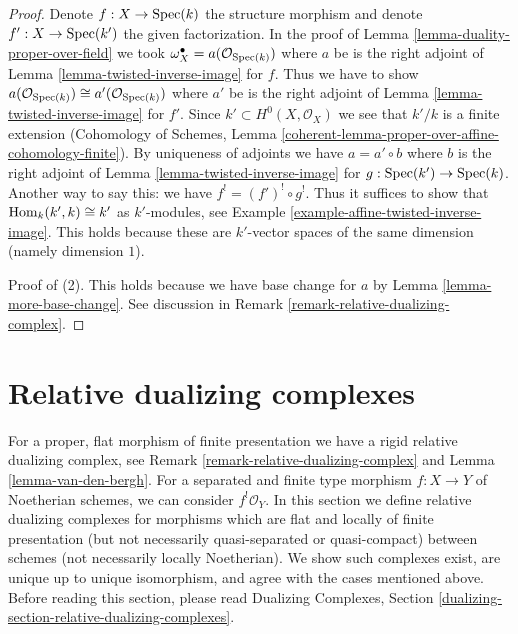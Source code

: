 \begin{proof}
Denote $f : X \to \mathop{\mathrm{Spec}}(k)$ the structure morphism and denote
$f' : X \to \mathop{\mathrm{Spec}}(k')$ the given factorization.
In the proof of Lemma \ref{lemma-duality-proper-over-field}
we took $\omega_X^\bullet = a(\mathcal{O}_{\mathop{\mathrm{Spec}}(k)})$
where $a$ be is the right adjoint of
Lemma \ref{lemma-twisted-inverse-image} for $f$.
Thus we have to show
$a(\mathcal{O}_{\mathop{\mathrm{Spec}}(k)}) \cong a'(\mathcal{O}_{\mathop{\mathrm{Spec}}(k)})$
where $a'$ be is the right adjoint of
Lemma \ref{lemma-twisted-inverse-image} for $f'$.
Since $k' \subset H^0(X, \mathcal{O}_X)$ we see that $k'/k$ is a finite
extension (Cohomology of Schemes, Lemma
\ref{coherent-lemma-proper-over-affine-cohomology-finite}).
By uniqueness of adjoints we have $a = a' \circ b$ where
$b$ is the right adjoint of Lemma
\ref{lemma-twisted-inverse-image} for $g : \mathop{\mathrm{Spec}}(k') \to \mathop{\mathrm{Spec}}(k)$.
Another way to say this: we have $f^! = (f')^! \circ g^!$.
Thus it suffices to show that $\mathop{\mathrm{Hom}}\nolimits_k(k', k) \cong k'$ as
$k'$-modules, see Example \ref{example-affine-twisted-inverse-image}.
This holds because these are $k'$-vector spaces of
the same dimension (namely dimension $1$).

\medskip\noindent
Proof of (2). This holds because we have base change for $a$ by
Lemma \ref{lemma-more-base-change}. See discussion in
Remark \ref{remark-relative-dualizing-complex}.
\end{proof}








\section{Relative dualizing complexes}
\label{section-relative-dualizing-complexes}

\noindent
For a proper, flat morphism of finite presentation we have a
rigid relative dualizing complex, see
Remark \ref{remark-relative-dualizing-complex} and
Lemma \ref{lemma-van-den-bergh}. For a separated and finite type
morphism $f : X \to Y$ of Noetherian schemes, we can consider
$f^!\mathcal{O}_Y$. In this section we define relative dualizing complexes
for morphisms which are flat and locally of finite presentation
(but not necessarily quasi-separated or quasi-compact) between
schemes (not necessarily locally Noetherian).
We show such complexes exist, are unique up to unique
isomorphism, and agree with the cases mentioned above.
Before reading this section, please read
Dualizing Complexes, Section
\ref{dualizing-section-relative-dualizing-complexes}.

